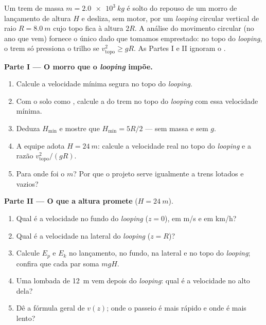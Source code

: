 \begin{problem}
\label{pb:g11:mechanical-energy:1}
Um trem de massa $m = \qty{2.0e3}{kg}$ é solto do repouso de um morro de
lançamento de altura $H$ e desliza, sem motor, por um \emph{looping}
circular vertical de raio $R = \qty{8.0}{m}$ cujo topo fica à altura
$2R$. A análise do movimento circular (no ano que vem) fornece o único
dado que tomamos emprestado: no topo do \emph{looping}, o trem só
pressiona o trilho se $v_{\text{topo}}^2 \geq gR$. As Partes I e II
ignoram o .

\medskip
\noindent\textbf{Parte I --- O morro que o \emph{looping} impõe.}
\begin{enumerate}
  \item Calcule a velocidade mínima segura no topo do \emph{looping}.
  \item Com o solo como , calcule a 
        do trem no topo do \emph{looping} com essa velocidade mínima.
  \item Deduza $H_{\min}$ e mostre que $H_{\min} = 5R/2$ --- sem massa e
        sem $g$.
  \item A equipe adota $H = \qty{24}{m}$: calcule a velocidade real no
        topo do \emph{looping} e a razão $v_{\text{topo}}^2/(gR)$.
  \item Para onde foi o $m$? Por que o projeto serve igualmente a trens
        lotados e vazios?
\end{enumerate}

\medskip
\noindent\textbf{Parte II --- O que a altura promete}
($H = \qty{24}{m}$).
\begin{enumerate}[resume]
  \item Qual é a velocidade no fundo do \emph{looping} ($z = 0$), em
        \unit{m/s} e em \unit{km/h}?
  \item Qual é a velocidade na lateral do \emph{looping} ($z = R$)?
  \item Calcule $E_p$ e $E_k$ no lançamento, no fundo, na lateral e no
        topo do \emph{looping}; confira que cada par soma $mgH$.
  \item Uma lombada de \qty{12}{m} vem depois do \emph{looping}: qual é a
        velocidade no alto dela?
  \item Dê a fórmula geral de $v(z)$; onde o passeio é mais rápido e onde
        é mais lento?
\end{enumerate}


\end{problem}
